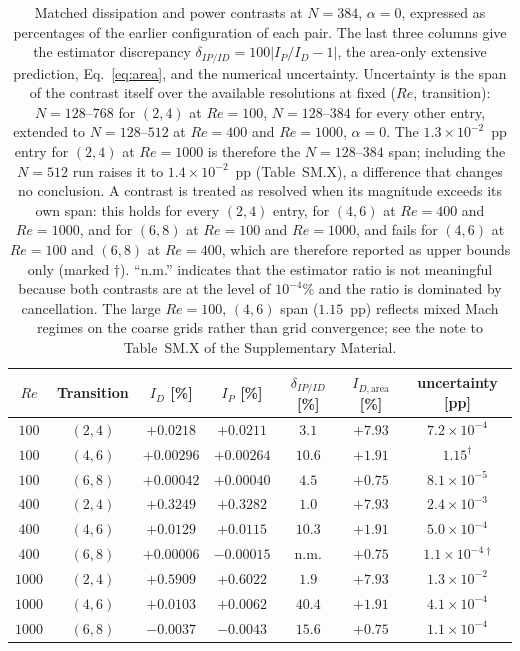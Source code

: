 \begin{table}[t]
\centering
\caption{Matched dissipation and power contrasts at $N=384$, $\alpha=0$, expressed as percentages of the earlier configuration of each pair. The last three columns give the estimator discrepancy $\delta_{IP/ID}=100|I_P/I_D-1|$, the area-only extensive prediction, Eq.~\eqref{eq:area}, and the numerical uncertainty. Uncertainty is the span of the contrast itself over the available resolutions at fixed ($Re$, transition): $N=128$--$768$ for $(2,4)$ at $Re=100$, $N=128$--$384$ for every other entry, extended to $N=128$--$512$ at $Re=400$ and $Re=1000$, $\alpha=0$. The $1.3\times10^{-2}$~pp entry for $(2,4)$ at $Re=1000$ is therefore the $N=128$--$384$ span; including the $N=512$ run raises it to $1.4\times10^{-2}$~pp (Table~SM.X), a difference that changes no conclusion. A contrast is treated as resolved when its magnitude exceeds its own span: this holds for every $(2,4)$ entry, for $(4,6)$ at $Re=400$ and $Re=1000$, and for $(6,8)$ at $Re=100$ and $Re=1000$, and fails for $(4,6)$ at $Re=100$ and $(6,8)$ at $Re=400$, which are therefore reported as upper bounds only (marked $\dagger$). ``n.m.'' indicates that the estimator ratio is not meaningful because both contrasts are at the level of $10^{-4}\%$ and the ratio is dominated by cancellation. The large $Re=100$, $(4,6)$ span ($1.15$~pp) reflects mixed Mach regimes on the coarse grids rather than grid convergence; see the note to Table~SM.X of the Supplementary Material.}
\label{tab:contrasts}
\begin{tabular}{@{}ccccccc@{}}
\hline
$Re$ & Transition & $I_D$ [\%] & $I_P$ [\%] & $\delta_{IP/ID}$ [\%] & $I_{D,\mathrm{area}}$ [\%] & uncertainty [pp] \\
\hline
$100$  & $(2,4)$ & $+0.0218$ & $+0.0211$ & $3.1$  & $+7.93$ & $7.2\times 10^{-4}$ \\
$100$  & $(4,6)$ & $+0.00296$ & $+0.00264$ & $10.6$ & $+1.91$ & $1.15^{\dagger}$ \\
$100$  & $(6,8)$ & $+0.00042$ & $+0.00040$ & $4.5$  & $+0.75$ & $8.1\times 10^{-5}$ \\
$400$  & $(2,4)$ & $+0.3249$ & $+0.3282$ & $1.0$  & $+7.93$ & $2.4\times 10^{-3}$ \\
$400$  & $(4,6)$ & $+0.0129$ & $+0.0115$ & $10.3$ & $+1.91$ & $5.0\times 10^{-4}$ \\
$400$  & $(6,8)$ & $+0.00006$& $-0.00015$& n.m.    & $+0.75$ & $1.1\times 10^{-4}$\,$^{\dagger}$ \\
$1000$ & $(2,4)$ & $+0.5909$ & $+0.6022$ & $1.9$  & $+7.93$ & $1.3\times 10^{-2}$ \\
$1000$ & $(4,6)$ & $+0.0103$ & $+0.0062$ & $40.4$ & $+1.91$ & $4.1\times 10^{-4}$ \\
$1000$ & $(6,8)$ & $-0.0037$ & $-0.0043$ & $15.6$ & $+0.75$ & $1.1\times 10^{-4}$ \\
\hline
\end{tabular}
\end{table}
